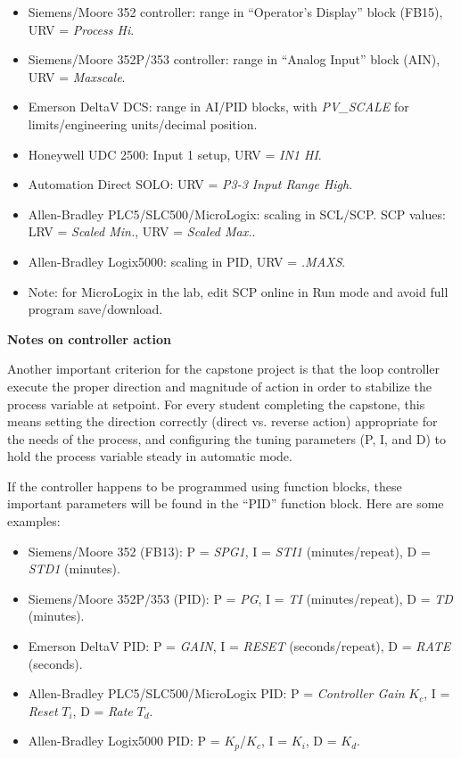 \begin{itemize}
\item{} Siemens/Moore 352 controller: range in ``Operator's Display'' block (FB15), URV = {\it Process Hi}.
\vskip 6pt
\item{} Siemens/Moore 352P/353 controller: range in ``Analog Input'' block (AIN), URV = {\it Maxscale}.
\vskip 6pt
\item{} Emerson DeltaV DCS: range in AI/PID blocks, with {\it PV\_SCALE} for limits/engineering units/decimal position.
\vskip 6pt
\item{} Honeywell UDC 2500: Input 1 setup, URV = {\it IN1 HI}.
\vskip 6pt
\item{} Automation Direct SOLO: URV = {\it P3-3 Input Range High}.
\vskip 6pt
\item{} Allen-Bradley PLC5/SLC500/MicroLogix: scaling in SCL/SCP.  SCP values: LRV = {\it Scaled Min.}, URV = {\it Scaled Max.}.
\vskip 6pt
\item{} Allen-Bradley Logix5000: scaling in PID, URV = {\it .MAXS}.
\vskip 6pt
\item{} Note: for MicroLogix in the lab, edit SCP online in Run mode and avoid full program save/download.
\end{itemize}

\vfil \eject

\centerline{\bf Notes on controller action}

\vskip 10pt

Another important criterion for the capstone project is that the loop controller execute the proper direction and magnitude of action in order to stabilize the process variable at setpoint.  For every student completing the capstone, this means setting the direction correctly (direct vs. reverse action) appropriate for the needs of the process, and configuring the tuning parameters (P, I, and D) to hold the process variable steady in automatic mode.

\vskip 10pt

If the controller happens to be programmed using function blocks, these important parameters will be found in the ``PID'' function block.  Here are some examples:

\begin{itemize}
\item{} Siemens/Moore 352 (FB13): P = {\it SPG1}, I = {\it STI1} (minutes/repeat), D = {\it STD1} (minutes).
\vskip 6pt
\item{} Siemens/Moore 352P/353 (PID): P = {\it PG}, I = {\it TI} (minutes/repeat), D = {\it TD} (minutes).
\vskip 6pt
\item{} Emerson DeltaV PID: P = {\it GAIN}, I = {\it RESET} (seconds/repeat), D = {\it RATE} (seconds).
\vskip 6pt
\item{} Allen-Bradley PLC5/SLC500/MicroLogix PID: P = {\it Controller Gain} $K_c$, I = {\it Reset} $T_i$, D = {\it Rate} $T_d$.
\vskip 6pt
\item{} Allen-Bradley Logix5000 PID: P = $K_p$/$K_c$, I = $K_i$, D = $K_d$.
\end{itemize}

